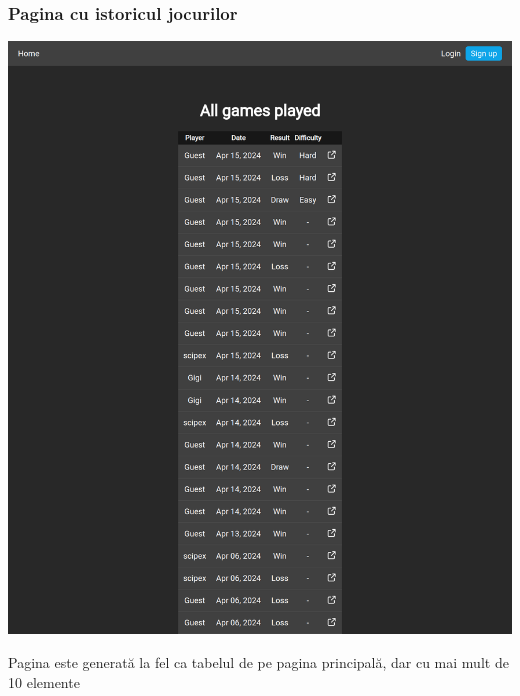 \vspace{3cm}
\subsubsection{Pagina cu istoricul jocurilor}

\vspace{1cm}
\begin{center}
	\includegraphics[width=15cm]{3/frontend/allgames.png}
\end{center}
\vspace{1cm}
Pagina este generată la fel ca tabelul de pe pagina principală, dar cu mai mult de 10 elemente
